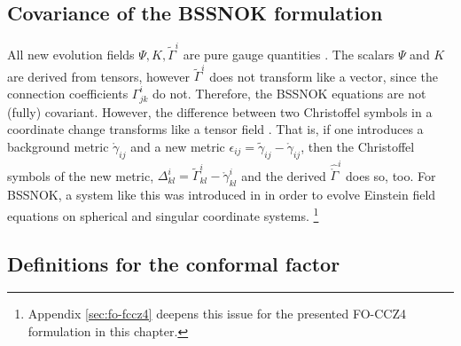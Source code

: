 \subsection{Covariance of the BSSNOK formulation}
All new evolution fields $\Psi, K, \tilde{\Gamma}^i$ are pure gauge quantities
\cite{Baumgarte99}. The scalars $\Psi$ and $K$ are derived from tensors,
however $\tilde{\Gamma}^i$ does not transform like a vector, since the connection
coefficients $\Gamma^i_{jk}$ do not. Therefore, the BSSNOK equations are not
(fully) covariant.
However, the difference between two Christoffel symbols in a coordinate change
transforms like a tensor field \cite{Gourgoulhon2012}. %
That is, if one introduces a background metric $\mathring{\gamma}_{ij}$
and a new metric $\epsilon_{ij} = \tilde{\gamma}_{ij} - \mathring{\gamma}_{ij}$, then
the Christoffel symbols of the new metric,
$\Delta^i_{kl} = \tilde{\Gamma}^i_{kl} - \mathring{\gamma}^i_{kl}$
and the derived $\hat{\mathring\Gamma}^i$ does so, too.
For BSSNOK, a system like this was introduced in \cite{Ruchlin2017} in 
order to evolve Einstein field equations on spherical and singular coordinate systems.
\footnote{Appendix \ref{sec:fo-fccz4} deepens this issue for the presented
  FO-CCZ4 formulation in this chapter.}

\subsection{Definitions for the conformal factor}%
\label{sec:conformal-factor}

